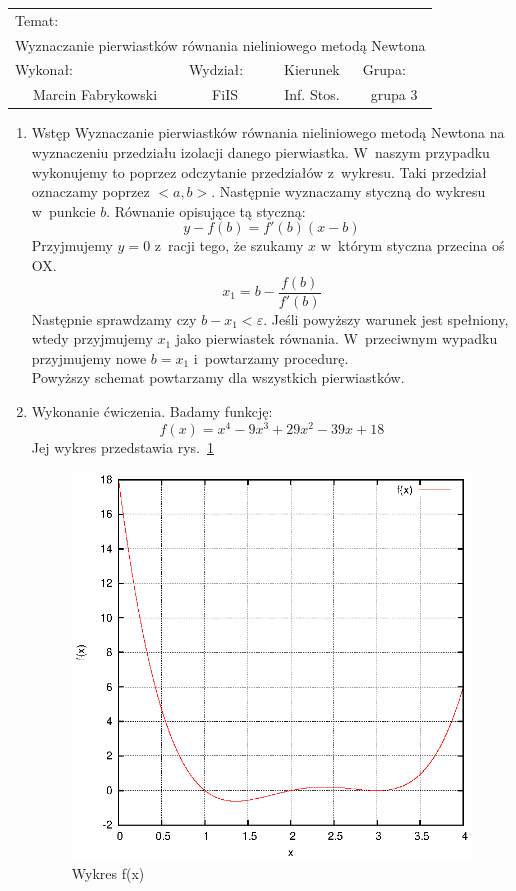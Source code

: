 \documentclass[12pt,a4paper]{article}
\begin{document}
 
\large
\begin{tabular}{|c|c|c|c|}
\hline
\multicolumn{4}{|l|}{Temat:}\\
\multicolumn{4}{|c|}{Wyznaczanie pierwiastków równania nieliniowego metodą Newtona}\\
\hline
\multicolumn{1}{|l}{Wykonał:}&\multicolumn{1}{|l}{Wydział:}&\multicolumn{1}{|c}{Kierunek}&\multicolumn{1}{|l|}{Grupa:}\\
Marcin Fabrykowski&FiIS&Inf. Stos.&grupa 3\\
\hline
\end{tabular}
\normalsize
\vspace{2cm}
\begin{enumerate}
\item Wstęp
Wyznaczanie pierwiastków równania nieliniowego metodą Newtona na wyznaczeniu przedziału izolacji danego pierwiastka. W~naszym przypadku wykonujemy to poprzez odczytanie przedziałów z~wykresu. Taki przedział oznaczamy poprzez $<a,b>$. Następnie wyznaczamy styczną do wykresu w~punkcie $b$. Równanie opisujące tą styczną: $$y-f(b)=f'(b)(x-b)$$
Przyjmujemy $y=0$ z~racji tego, że szukamy $x$ w~którym styczna przecina oś OX.$$x_1=b-\dfrac{f(b)}{f'(b)}$$
Następnie sprawdzamy czy $b-x_1<\varepsilon$. Jeśli powyższy warunek jest spełniony, wtedy przyjmujemy $x_1$ jako pierwiastek równania. W~przeciwnym wypadku przyjmujemy nowe $b=x_1$ i~powtarzamy procedurę.\\
Powyższy schemat powtarzamy dla wszystkich pierwiastków.
\item Wykonanie ćwiczenia.
Badamy funkcję:
$$f(x)=x^4-9x^3+29x^2-39x+18$$
Jej wykres przedstawia rys.~\ref{fig:wykres}\\
\begin{figure}
\caption{Wykres f(x)}
\label{fig:wykres}
\includegraphics{f.eps}

\end{figure}
\end{enumerate}
\end{document}
